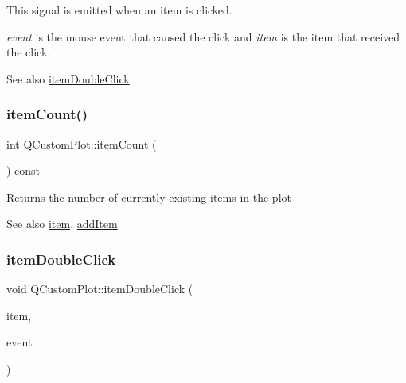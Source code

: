 This signal is emitted when an item is clicked.

{\itshape event} is the mouse event that caused the click and {\itshape item} is the item that received the click.

\begin{DoxySeeAlso}{See also}
\hyperlink{class_q_custom_plot_ac83aa9f5a3e9bb3efc9cdc763dcd42a6}{item\+Double\+Click} 
\end{DoxySeeAlso}
\hypertarget{class_q_custom_plot_a16025daf0341f9362be3080e404424c2}{}\label{class_q_custom_plot_a16025daf0341f9362be3080e404424c2} 
\subsubsection{\texorpdfstring{item\+Count()}{itemCount()}}
{\footnotesize\ttfamily int Q\+Custom\+Plot\+::item\+Count (\begin{DoxyParamCaption}{ }\end{DoxyParamCaption}) const}

Returns the number of currently existing items in the plot

\begin{DoxySeeAlso}{See also}
\hyperlink{class_q_custom_plot_ac042f2e78edd228ccf2f26b7fe215239}{item}, \hyperlink{class_q_custom_plot_aa500620379262321685cb7a7674cbd2a}{add\+Item} 
\end{DoxySeeAlso}
\hypertarget{class_q_custom_plot_ac83aa9f5a3e9bb3efc9cdc763dcd42a6}{}\label{class_q_custom_plot_ac83aa9f5a3e9bb3efc9cdc763dcd42a6} 
\subsubsection{\texorpdfstring{item\+Double\+Click}{itemDoubleClick}}
{\footnotesize\ttfamily void Q\+Custom\+Plot\+::item\+Double\+Click (\begin{DoxyParamCaption}\item[{\hyperlink{class_q_c_p_abstract_item}{Q\+C\+P\+Abstract\+Item} $\ast$}]{item,  }\item[{Q\+Mouse\+Event $\ast$}]{event }\end{DoxyParamCaption})\hspace{0.3cm}{\ttfamily [signal]}}

